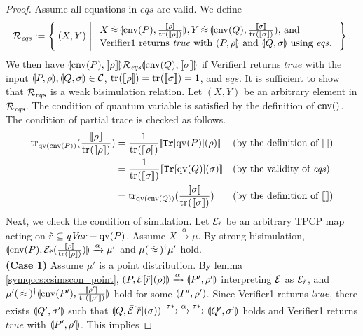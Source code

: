 \begin{proof}
 Assume all equations in $\mathit{eqs}$ are valid. We define
\[
 \R_{\mathit{eqs}} :=
 \Set{(X, Y) |
 \begin{array}{l}
  \text{$X \strg \con{\cnv{P}}{\frac{\braw{\rho}}{\tr{}{\braw{\rho}}}},
   Y \strg \con{\cnv{Q}}{\frac{\braw{\sigma}}{\tr{}{\braw{\sigma}}}}$,
   and}\\
  \text{Verifier1 returns $\mathit{true}$ with 
 $\con{P}{\rho}$ and $\con{Q}{\sigma}$ using $\mathit{eqs}$.}
 \end{array}
 }.
\]
We then have $\llparenthesis \mathrm{cnv}(P)
 , [\![\rho]\!] \rrparenthesis \mathcal{R}_{\mathit{eqs}} \llparenthesis \mathrm{cnv}(Q), [\![\sigma]\!] \rrparenthesis$ if
Verifier1 returns $\mathit{true}$ with the input $\llparenthesis P, \rho \rrparenthesis,
 \llparenthesis Q, \sigma \rrparenthesis \in \mathcal{C}$, ${\rm tr}_{}([\![\rho]\!])={\rm tr}_{}([\![\sigma]\!])=1$,
 and $\mathit{eqs}$. It is sufficient to show that $\mathcal{R}_{\mathit{eqs}}$
 is a weak bisimulation relation. Let
 $(X, Y)$ be
 an arbitrary element in $\mathcal{R}_{\mathit{eqs}}$. The condition of
 quantum variable is satisfied by the definition of $\mathrm{cnv}()$.
 The condition of partial trace is checked as follows.
 \begin{align*}
  \tr{\qv{\cnv{P}}}{\frac{\braw{\rho}}{\tr{}{\braw{\rho}}}} 
  &= 
  \frac{1}{\tr{}{\braw{\rho}}}\braw{\mathtt{Tr}[\qv{P}](\rho)}
  && (\mbox{by the definition of } \braw{})\\
  &= \frac{1}{\tr{}{\braw{\sigma}}}\braw{\mathtt{Tr}[\qv{Q}](\sigma)}
  && (\mbox{by the validity of } \mathit{eqs})\\
  &= \tr{\qv{\cnv{Q}}}{\frac{\braw{\sigma}}{\tr{}{\braw{\sigma}}}} 
  && (\mbox{by the definition of } \braw{})
 \end{align*}
Next, we check the condition of simulation. Let $\mathcal{E}_{\tilde r}$ be
an arbitrary TPCP map acting on $\tilde r \subseteq \mathit{qVar} - \mathrm{qv}(P)$.
Assume $X \xrightarrow{\alpha} \mu$.
By strong bisimulation,
$\llparenthesis \mathrm{cnv}(P), \mathcal{E}_{\tilde r}(\frac{[\![\rho]\!]}{{\rm tr}_{}([\![\rho]\!])}) \rrparenthesis
\xrightarrow{\alpha} \mu'$ and $\mu (\,\dot\approx\,)^\dagger \mu'$ hold.
\\
{\bf (Case 1)} Assume $\mu'$ is a point distribution.
 By lemma \ref{symqccs:csimscon_point},
 $\llparenthesis P, \bar {\mathcal{E}}[\tilde r](\rho) \rrparenthesis \xrightarrow{\alpha}
 \llparenthesis P', \rho' \rrparenthesis$ interpreting $\bar {\mathcal{E}}$ as $\mathcal{E}_{\tilde r}$, 
 and $\mu' (\,\dot\approx\,)^\dagger
 \llparenthesis \mathrm{cnv}(P'), \frac{[\![\rho']\!]}{{\rm tr}_{}([\![\rho']\!])} \rrparenthesis$
 hold for some $\llparenthesis P', \rho' \rrparenthesis$. 
Since Verifier1 returns $\mathit{true}$, 
 there exists $\llparenthesis Q', \sigma' \rrparenthesis$ such that 
$\llparenthesis Q, \bar {\mathcal{E}}[\tilde
 r](\sigma) \rrparenthesis \xrightarrow{\tau*} \xrightarrow{\hat \alpha} \xrightarrow{\tau*} \llparenthesis Q', \sigma' \rrparenthesis$ holds and
 Verifier1
 returns $\mathit{true}$ with $\llparenthesis P', \rho' \rrparenthesis$. This implies 

\end{proof}
